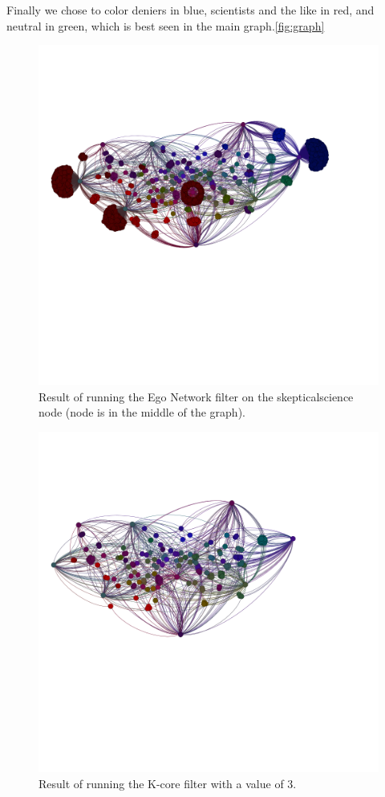 \documentclass[11pt]{article}
\begin{document}
Finally we chose to color deniers in blue, scientists and the like in red, and neutral in green,
which is best seen in the main graph.\ref{fig:graph}

\begin{figure}
  \includegraphics[width=\linewidth]{Figure_4.png}
  \caption{Result of running the Ego Network filter on the skepticalscience node (node is in the middle of the graph).}
  \label{fig:graph2}
\end{figure}

\begin{figure}
  \includegraphics[width=\linewidth]{Figure_5.png}
  \caption{Result of running the K-core filter with a value of 3.}
  \label{fig:graph3}
\end{figure}
\end{document}
